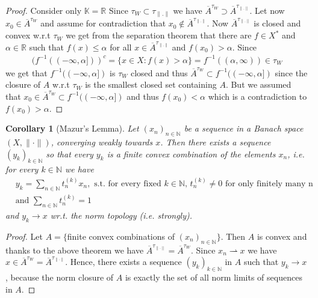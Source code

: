 \documentclass[11pt,a4paper]{article}
\newtheorem{cor}{Corollary}[section]
\theoremstyle{definition}
\newcommand{\wto}{\rightharpoonup}
\begin{document}
\begin{proof}
Consider only $\mathbb{K}= \mathbb{R}$ Since $\tau_W \subset \tau_{ \|. \|}$ we have $\overline{A}^{ \tau_W} \supset \overline{A}^{ \tau_{ \| . \|}}$. Let now $x_0 \in \overline{A}^{ \tau_W}$ and assume for contradiction that $x_0 \notin \overline{A}^{ \tau_{ \|.\|}}$. Now $\overline{A}^{ \tau_{ \|.\|}}$ is closed and convex w.r.t $\tau_W$ we get from the separation theorem that there are $f \in X^*$ and $\alpha \in \mathbb{R}$ such that $f(x) \leq \alpha$ for all $x \in \overline{A}^{ \tau_{ \|.\|}}$ and $f(x_0) > \alpha$. Since
\begin{align*}
(f^{-1}((- \infty, \alpha]))^c = \{ x \in X : f(x) > \alpha \} = f^{-1}(( \alpha, \infty)) \in \tau_W
\end{align*}
we get that $f^{-1}((- \infty, \alpha])$ is $\tau_W$ closed and thus $\overline{A}^{ \tau_W} \subset f^{-1}((- \infty, \alpha])$ since the closure of $A$ w.r.t $\tau_W$ is the smallest closed set containing $A$. But we assumed that $x_0 \in \overline{A}^{\tau_W}\subset f^{-1}((- \infty, \alpha])$ and thus $f(x_0) < \alpha$ which is a contradiction to $f(x_0) > \alpha$. 
\end{proof}
\begin{cor}[Mazur's Lemma] Let $(x_n)_{n \in \mathbb{N}}$ be a sequence in a Banach space $(X, \| \cdot \|)$, converging weakly towards $x$. Then there exists a sequence $(y_k)_{k \in \mathbb{N}}$ so that every $y_k$ is a finite convex combination of the elements $x_n$, i.e. for every $k \in \mathbb{N}$ we have
\begin{align*}
&y_k = \sum_{n \in \mathbb{N}} t_n^{(k)} x_n, \text{ s.t. for every fixed $k \in \mathbb{N}$, } t_n^{(k)} \neq 0 \text{ for only finitely many n} \\
&\text{and } \sum_{n \in \mathbb{N}} t_n^{(k)} = 1
\end{align*}
and $y_k \to x$ wr.t. the norm topology (i.e. strongly). 
\end{cor}
\begin{proof}
Let $A= \lbrace$finite convex combinations of $(x_n)_{n \in \mathbb{N}} \rbrace$. Then $A$ is convex and thanks to the above theorem we have $\overline{A}^{ \tau_{ \| \cdot \|}} = \overline{A}^{ \tau_W}$. Since $x_n \wto x $ we have $x \in \overline{A}^{ \tau_W}=\overline{A}^{ \tau_{ \| \cdot \|}}$. Hence, there exists a sequence $(y_k)_{k \in \mathbb{N}}$ in $A$ such that $y_k \to x$, because the norm closure of $A$ is exactly the set of all norm limits of sequences in $A$. 
\end{proof}
\newpage
\end{document}
